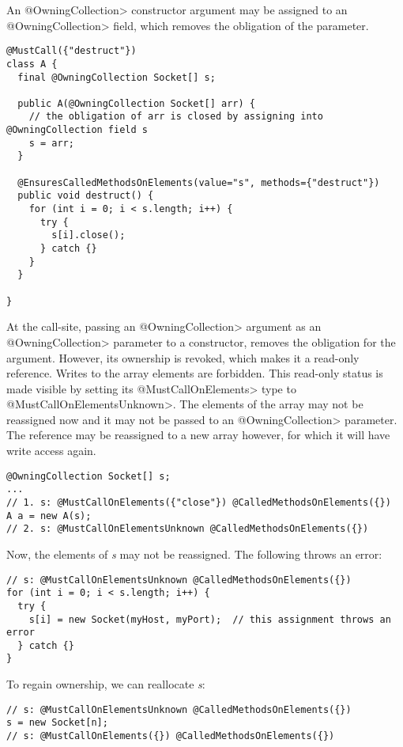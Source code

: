 An \<@OwningCollection> constructor argument may be assigned to an \<@OwningCollection> field, which removes the obligation of the parameter.

\begin{verbatim}
@MustCall({"destruct"})
class A {
  final @OwningCollection Socket[] s;

  public A(@OwningCollection Socket[] arr) {
    // the obligation of arr is closed by assigning into @OwningCollection field s
    s = arr;
  }

  @EnsuresCalledMethodsOnElements(value="s", methods={"destruct"})
  public void destruct() {
    for (int i = 0; i < s.length; i++) {
      try {
        s[i].close();
      } catch {}
    }
  }

}
\end{verbatim}

At the call-site, passing an \<@OwningCollection> argument as an \<@OwningCollection> parameter to a constructor, removes the obligation for the argument. However, its ownership is revoked, which makes it a read-only reference. Writes to the array elements are forbidden. This read-only status is made visible by setting its \<@MustCallOnElements> type to \<@MustCallOnElementsUnknown>. The elements of the array may not be reassigned now and it may not be passed to an \<@OwningCollection> parameter. The reference may be reassigned to a new array however, for which it will have write access again.

\begin{verbatim}
@OwningCollection Socket[] s;
...
// 1. s: @MustCallOnElements({"close"}) @CalledMethodsOnElements({})
A a = new A(s);
// 2. s: @MustCallOnElementsUnknown @CalledMethodsOnElements({})
\end{verbatim}

Now, the elements of \textit{s} may not be reassigned. The following throws an error:

\begin{verbatim}
// s: @MustCallOnElementsUnknown @CalledMethodsOnElements({})
for (int i = 0; i < s.length; i++) {
  try {
    s[i] = new Socket(myHost, myPort);  // this assignment throws an error
  } catch {}
}
\end{verbatim}

To regain ownership, we can reallocate \textit{s}:

\begin{verbatim}
// s: @MustCallOnElementsUnknown @CalledMethodsOnElements({})
s = new Socket[n];
// s: @MustCallOnElements({}) @CalledMethodsOnElements({})
\end{verbatim}

